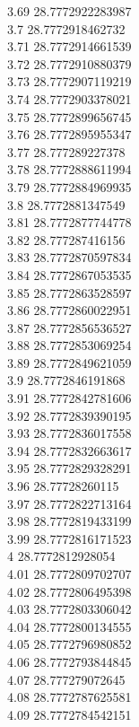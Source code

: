 {3.69	28.7772922283987\\
3.7	28.7772918462732\\
3.71	28.7772914661539\\
3.72	28.7772910880379\\
3.73	28.7772907119219\\
3.74	28.7772903378021\\
3.75	28.7772899656745\\
3.76	28.7772895955347\\
3.77	28.777289227378\\
3.78	28.7772888611994\\
3.79	28.7772884969935\\
3.8	28.7772881347549\\
3.81	28.7772877744778\\
3.82	28.777287416156\\
3.83	28.7772870597834\\
3.84	28.7772867053535\\
3.85	28.7772863528597\\
3.86	28.7772860022951\\
3.87	28.7772856536527\\
3.88	28.7772853069254\\
3.89	28.7772849621059\\
3.9	28.7772846191868\\
3.91	28.7772842781606\\
3.92	28.7772839390195\\
3.93	28.7772836017558\\
3.94	28.7772832663617\\
3.95	28.7772829328291\\
3.96	28.77728260115\\
3.97	28.7772822713164\\
3.98	28.7772819433199\\
3.99	28.7772816171523\\
4	28.7772812928054\\
4.01	28.7772809702707\\
4.02	28.7772806495398\\
4.03	28.7772803306042\\
4.04	28.7772800134555\\
4.05	28.7772796980852\\
4.06	28.7772793844845\\
4.07	28.777279072645\\
4.08	28.7772787625581\\
4.09	28.7772784542151\\
}
